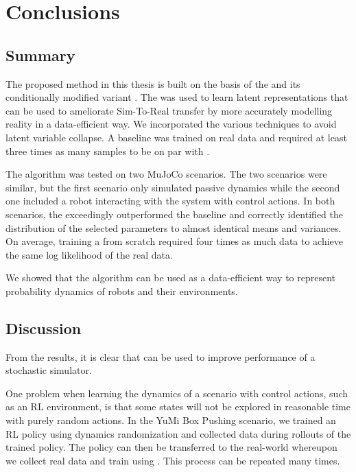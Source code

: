 \chapter{Conclusions}
\label{conclusions}

\section{Summary}

The proposed method in this thesis is built on the basis of the \vae{} and its conditionally modified variant \cvae{}. The \cvae{} was used to learn latent representations that can be used to ameliorate Sim-To-Real transfer by more accurately modelling reality in a data-efficient way. We incorporated the various techniques to avoid latent variable collapse. A baseline \cvae{} was trained on real data and required at least three times as many samples to be on par with \dettostoc{}.

The \dettostoc{} algorithm was tested on two MuJoCo scenarios. The two scenarios were similar, but the first scenario only simulated passive dynamics while the second one included a robot interacting with the system with control actions. In both scenarios, the \dettostoc{} exceedingly outperformed the baseline and correctly identified the distribution of the selected parameters to almost identical means and variances. On average, training a \cvae{} from scratch required four times as much data to achieve the same log likelihood of the real data.

We showed that the \dettostoc{} algorithm can be used as a data-efficient way to represent probability dynamics of robots and their environments.

\section{Discussion}

From the results, it is clear that \dettostoc{} can be used to improve performance of a stochastic simulator. 

One problem when learning the dynamics of a scenario with control actions, such as an RL environment, is that some states will not be explored in reasonable time with purely random actions. In the YuMi Box Pushing scenario, we trained an RL policy using dynamics randomization and collected data during rollouts of the trained policy. The policy can then be transferred to the real-world whereupon we collect real data and train using \dettostoc{}. This process can be repeated many times.

